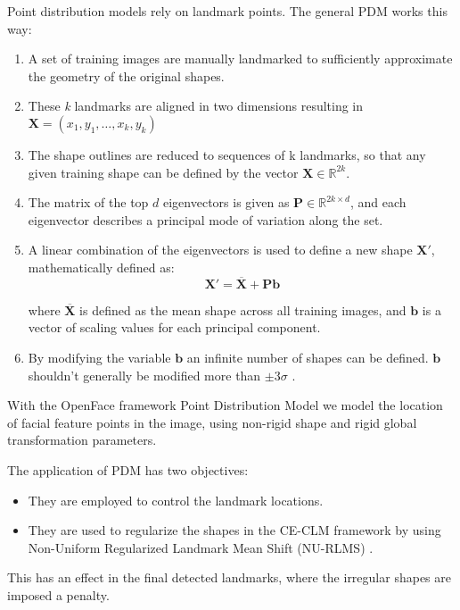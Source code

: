 Point distribution models rely on landmark points. The general PDM works this way:
\begin{enumerate}
	\item A set of training images are manually landmarked to sufficiently approximate the geometry of the original shapes. 
	\item These \textit{k} landmarks are aligned in two dimensions resulting in \\
	$\mathbf{X} = (x_1,y_1, \dots, x_k, y_k)$
	\item The shape outlines are reduced to sequences of k landmarks, so that any given training shape can be defined by the vector $\mathbf{X} \in {\mathbb{R} ^{2k}}$.
	\item The matrix of the top $d$ eigenvectors is given as $\mathbf{P} \in \mathbb{R}^{2k \times d}$, and each eigenvector describes a principal mode of variation along the set.
	\item A linear combination of the eigenvectors is used to define a new shape $ \mathbf{X} '$, mathematically defined as: 
	\begin{equation}
	\mathbf {X}' = {\overline {\mathbf {X}} + \mathbf{P} \mathbf{b}}
	\end{equation}
	
	where $ {\overline {\mathbf {X}}}$ is defined as the mean shape across all training images, and $\mathbf {b}$ is a vector of scaling values for each principal component. 
	\item By modifying the variable $\mathbf {b}$  an infinite number of shapes can be defined. $\mathbf {b}$ shouldn't generally be modified more than $\pm3\sigma$ \cite{wiki:PDM}.
\end{enumerate}

With the OpenFace framework Point Distribution Model \cite{PDM_RLMS} we model the location of facial feature points in the image, using non-rigid shape and rigid global transformation parameters.

The application of PDM has two objectives:

\begin{itemize}
	\item They are employed to control the landmark locations.
	\item They are used to regularize the shapes in the CE-CLM framework by using Non-Uniform Regularized Landmark Mean Shift (NU-RLMS) \cite{Baltru2013}.
\end{itemize}
This has an effect in the final detected landmarks, where the irregular shapes are imposed a penalty.

